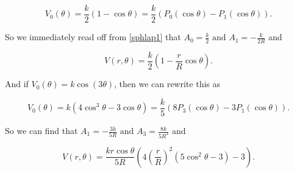 \documentclass[a4paper,12pt]{report}
\begin{document}
\begin{example_template}
		\begin{equation}
			V_0(\theta ) = \frac{k}{2} (1-\cos \theta ) = \frac{k}{2} (P_0(\cos \theta ) - P_1(\cos \theta )).
		\end{equation}
		
		So we immediately read off from \cref{sphlap1} that \(A_0 = \frac{k}{2} \text{ and }  A_1 = -\frac{k}{2R} \) and
		
		\begin{equation}
			V(r,\theta )  = \frac{k}{2} (1 - \frac{r}{R} \cos \theta ).
		\end{equation}	
		
		And if \(V_0(\theta) = k\cos (3 \theta)\), then we can rewrite this as
		
		\begin{equation}
			V_0(\theta) = k(4\cos ^3 \theta - 3\cos \theta) = \frac{k}{5} (8P_3 (\cos \theta) - 3P_1(\cos \theta)).
		\end{equation}
		
		So we can find that \(A_1 = -\frac{3k}{5R} \text{ and } A_3 = \frac{8k}{5R^3} \) and 
		
		\begin{equation}
			V(r,\theta) = \frac{kr\cos \theta}{5R} (4(\frac{r}{R} )^2(5\cos ^2 \theta-3)-3). 
		\end{equation}
		
		
	\end{example_template}
	
\end{document}
